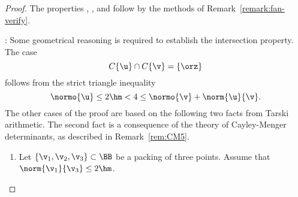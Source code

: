 \begin{proof}
The properties , , and  follow
by the methods of Remark~\ref{remark:fan-verify}.

: Some geometrical reasoning is required to
establish the intersection property.  The case
\[ 
C\{\u\}\cap C\{\v\} = \{\orz\}
\] 
follows from the strict triangle inequality 
\[ 
\normo{\u} \le 2\hm < 4 \le \normo{\v} + \norm{\u}{\v}.
\] 
The other cases of the proof are based on the following two facts from
Tarski arithmetic.  The second fact is a consequence of the theory of
Cayley-Menger determinants, as described in Remark~\ref{rem:CM5}.
\begin{enumerate}
\item {} Let $\{\v_1,\v_2,\v_3\}\subset \BB$ be a
  packing of three points.  Assume that $\norm{\v_1}{\v_3}\le 2\hm$.

\end{enumerate}
\end{proof}
